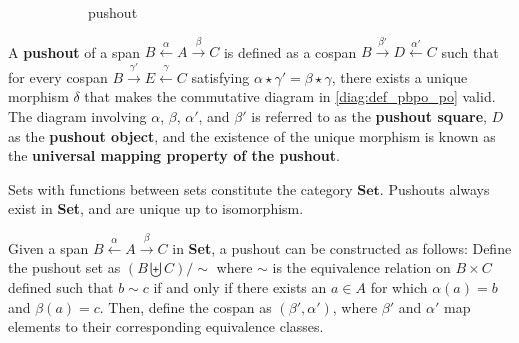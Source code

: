 \begin{definition}
    \begin{figure}[htbp] 
        \center
        \begin{subfigure}[b]{0.38 \textwidth}
            \center
            \caption{pushout}
            \label{diag:def_pbpo_po}
        \end{subfigure}
        \caption{}
        \label{fig:def_pb_po}
    \end{figure}
    A \textbf{pushout} of a span \( B \overset{\alpha}{\leftarrow} A \overset{\beta}{\rightarrow} C \) is defined as a cospan \( B \overset{\beta'}{\rightarrow} D \overset{\alpha'}{\leftarrow} C \) such that for every cospan \( B \overset{\gamma'}{\rightarrow} E \overset{\gamma}{\leftarrow} C \) satisfying \(\alpha \star \gamma' = \beta \star \gamma\), there exists a unique morphism \(\delta\) that makes the commutative diagram in \autoref{diag:def_pbpo_po} valid. The diagram involving \(\alpha\), \(\beta\), \(\alpha'\), and \(\beta'\) is referred to as the \textbf{pushout square}, \(D\) as the \textbf{pushout object}, and the existence of the unique morphism is known as the \textbf{universal mapping property of the pushout}.
\end{definition}

Sets with functions between sets constitute the category \(\mathbf{Set}\). Pushouts always exist in \textbf{Set}, and are unique up to isomorphism.

\begin{example}
    Given a span \( B \overset{\alpha}{\leftarrow} A \overset{\beta}{\rightarrow} C \) in \textbf{Set}, a pushout can be constructed as follows:
    Define the pushout set as
    \(
     (B \biguplus C) / \sim
    \)
    where \(\sim\) is the equivalence relation on \(B \times C\) defined such that \( b \sim c \) if and only if there exists an \(a \in A\) for which \(\alpha(a) = b\) and \(\beta(a) = c\). Then, define the cospan as \( (\beta',\alpha') \), where \(\beta'\) and \(\alpha'\) map elements to their corresponding equivalence classes.
\end{example}